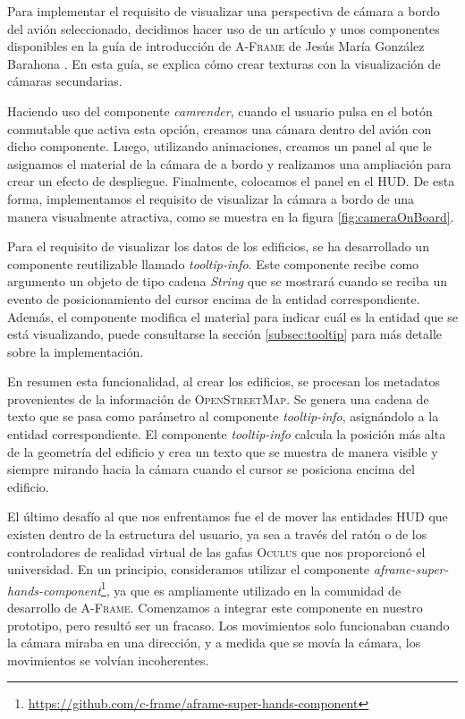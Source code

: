 \documentclass[a4paper, 11pt]{book}
\begin{document}
Para implementar el requisito de visualizar una perspectiva de cámara a bordo del avión seleccionado, decidimos hacer uso de un artículo y unos componentes disponibles en la guía de introducción de \textsc{A-Frame} de Jesús María González Barahona \cite{aframe_notes}. En esta guía, se explica cómo crear texturas con la visualización de cámaras secundarias.

Haciendo uso del componente \emph{camrender}, cuando el usuario pulsa en el botón conmutable que activa esta opción, creamos una cámara dentro del avión con dicho componente. Luego, utilizando animaciones, creamos un panel al que le asignamos el material de la cámara de a bordo y realizamos una ampliación para crear un efecto de despliegue. Finalmente, colocamos el panel en el \textsc{\gls{HUD}}. De esta forma, implementamos el requisito de visualizar la cámara a bordo de una manera visualmente atractiva, como se muestra en la figura \ref{fig:cameraOnBoard}.

Para el requisito de visualizar los datos de los edificios, se ha desarrollado un componente reutilizable llamado \emph{tooltip-info}. Este componente recibe como argumento un objeto de tipo cadena \emph{String} que se mostrará cuando se reciba un evento de posicionamiento del cursor encima de la entidad correspondiente. Además, el componente modifica el material para indicar cuál es la entidad que se está visualizando, puede consultarse la sección \ref{subsec:tooltip} para más detalle sobre la implementación.

En resumen esta funcionalidad, al crear los edificios, se procesan los metadatos provenientes de la información de \textsc{OpenStreetMap}. Se genera una cadena de texto que se pasa como parámetro al componente \emph{tooltip-info}, asignándolo a la entidad correspondiente. El componente \emph{tooltip-info} calcula la posición más alta de la geometría del edificio y crea un texto que se muestra de manera visible y siempre mirando hacia la cámara cuando el cursor se posiciona encima del edificio.

El último desafío al que nos enfrentamos fue el de mover las entidades \textsc{\gls{HUD}} que existen dentro de la estructura del usuario, ya sea a través del ratón o de los controladores de realidad virtual de las gafas \textsc{Oculus} que nos proporcionó el universidad. En un principio, consideramos utilizar el componente \emph{aframe-super-hands-component}\footnote{\url{https://github.com/c-frame/aframe-super-hands-component}}, ya que es ampliamente utilizado en la comunidad de desarrollo de \textsc{A-Frame}. Comenzamos a integrar este componente en nuestro prototipo, pero resultó ser un fracaso. Los movimientos solo funcionaban cuando la cámara miraba en una dirección, y a medida que se movía la cámara, los movimientos se volvían incoherentes.
\end{document}
